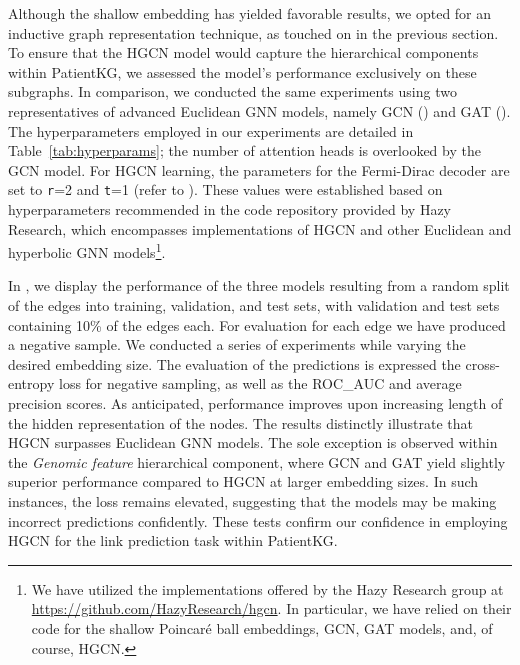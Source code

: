 Although the shallow embedding has yielded favorable results, we opted for an inductive graph representation technique, as touched on in the previous section. To ensure that the HGCN model would capture the hierarchical components within PatientKG, we assessed the model's performance exclusively on these subgraphs. In comparison, we conducted the same experiments using two representatives of advanced Euclidean GNN models, namely GCN () and GAT (). The hyperparameters employed in our experiments are detailed in Table~\ref{tab:hyperparams}; the number of attention heads is overlooked by the GCN model. For HGCN learning, the parameters for the Fermi-Dirac decoder are set to \texttt{r}=2 and \texttt{t}=1 (refer to ). These values were established based on hyperparameters recommended in the code repository provided by Hazy Research, which encompasses implementations of HGCN and other Euclidean and hyperbolic GNN models\footnote{We have utilized the implementations offered by the Hazy Research group at \url{https://github.com/HazyResearch/hgcn}. In particular, we have relied on their code for the shallow Poincaré ball embeddings, GCN, GAT models, and, of course, HGCN.}. 


In , we display the performance of the three models resulting from a random split of the edges into training, validation, and test sets, with validation and test sets containing 10\% of the edges each. For evaluation for each edge we have produced a negative sample. We conducted a series of experiments while varying the desired embedding size. The evaluation of the predictions is expressed the cross-entropy loss for negative sampling, as well as the ROC\_AUC and average precision scores. As anticipated, performance improves upon increasing length of the hidden representation of the nodes. The results distinctly illustrate that HGCN surpasses Euclidean GNN models. The sole exception is observed within the \emph{Genomic feature} hierarchical component, where GCN and GAT yield slightly superior performance compared to HGCN at larger embedding sizes. In such instances, the loss remains elevated, suggesting that the models may be making incorrect predictions confidently. These tests confirm our confidence in employing HGCN for the link prediction task within PatientKG.


